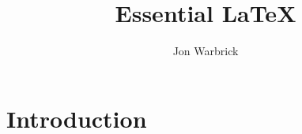 





\newlength{\egwidth}\setlength{\egwidth}{0.42\textwidth}

\newenvironment{eg}%
{\begin{list}{}{\setlength{\leftmargin}{0.05\textwidth}%
\setlength{\rightmargin}{\leftmargin}}\item[]\footnotesize}%
{\end{list}}

\newenvironment{egbox}%
{\begin{minipage}[t]{\egwidth}}%
{\end{minipage}}

\newcommand{\egstart}{\begin{eg}\begin{egbox}}
\newcommand{\egmid}{\end{egbox}\hfill\begin{egbox}}
\newcommand{\egend}{\end{egbox}\end{eg}}


\newcommand{\fn}[1]{\hbox{\tt #1}}
\newcommand{\llo}[1]{(see line #1)}
\newcommand{\lls}[1]{(see lines #1)}
\newcommand{\bs}{$\backslash$}

\title{Essential \LaTeX}
\author{Jon Warbrick}



\maketitle

\section{Introduction}

